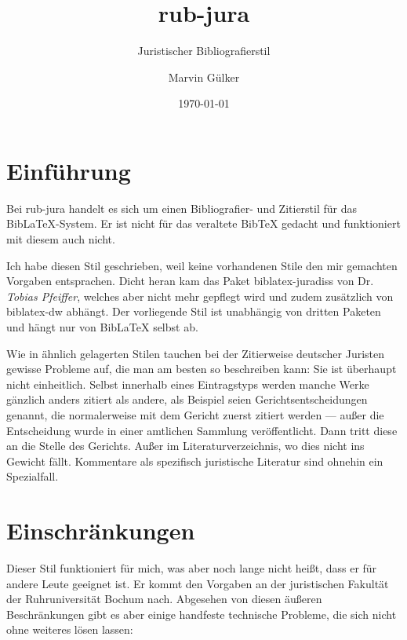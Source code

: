 \documentclass[11pt,a4paper,DIV=calc]{scrartcl}
\newcommand\software[1]{\textsf{#1}}
\newcommand\rj{\software{rub-jura}\xspace}
\newcommand\Biblatex{\software{Bib\LaTeX{}}\xspace}
\newcommand\name[1]{\textit{#1}}
\begin{document}
\title{rub-jura}
\subtitle{Juristischer Bibliografierstil}
\author{Marvin Gülker}
\date{\today}
\maketitle{}

\tableofcontents{}

\section{Einführung}

Bei \rj handelt es sich um einen Bibliografier- und Zitierstil für das
\Biblatex-System. Er ist nicht für das veraltete \software{Bib\TeX{}}
gedacht und funktioniert mit diesem auch nicht.

Ich habe diesen Stil geschrieben, weil keine vorhandenen Stile den mir
gemachten Vorgaben entsprachen. Dicht heran kam das Paket
\software{biblatex-juradiss} von Dr. \name{Tobias Pfeiffer}, welches
aber nicht mehr gepflegt wird und zudem zusätzlich von
\software{biblatex-dw} abhängt. Der vorliegende Stil ist unabhängig
von dritten Paketen und hängt nur von \Biblatex selbst ab.

Wie in ähnlich gelagerten Stilen tauchen bei der Zitierweise deutscher
Juristen gewisse Probleme auf, die man am besten so beschreiben kann:
Sie ist überhaupt nicht einheitlich. Selbst innerhalb eines
Eintragstyps werden manche Werke gänzlich anders zitiert als andere,
als Beispiel seien Gerichtsentscheidungen genannt, die normalerweise
mit dem Gericht zuerst zitiert werden — außer die Entscheidung wurde
in einer amtlichen Sammlung veröffentlicht. Dann tritt diese an die
Stelle des Gerichts. Außer im Literaturverzeichnis, wo dies nicht ins
Gewicht fällt. Kommentare als spezifisch juristische Literatur sind
ohnehin ein Spezialfall.

\section{Einschränkungen}

Dieser Stil funktioniert für mich, was aber noch lange nicht heißt,
dass er für andere Leute geeignet ist. Er kommt den Vorgaben an der
juristischen Fakultät der Ruhruniversität Bochum nach. Abgesehen von
diesen äußeren Beschränkungen gibt es aber einige handfeste technische
Probleme, die sich nicht ohne weiteres lösen lassen:
\end{document}
